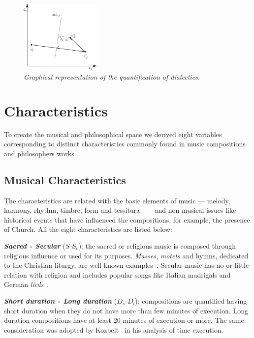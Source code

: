 \documentclass[
 aip,
 jmp,
 amsmath,amssymb,
 reprint,
]{revtex4-1}
\begin{document}
\begin{figure}
        \begin{center}
                \includegraphics[width=0.35\textwidth]{dialetica_.eps}
        \end{center}
        \caption{\it Graphical representation of the quantification of dialectics.}
        \label{fig.2}
\end{figure}

\section{Characteristics}

To create the musical and philosophical space we derived eight variables corresponding to
distinct characteristics commonly found in music compositions and philosophers works. 

\subsection{Musical Characteristics}

The
characteristics are related with the basic elements of music --- melody,
harmony, rhythm, timbre, form and tessitura~\cite{BennettHistory} --- and
non-musical issues like historical events that have influenced the
compositions, for example, the
presence of Church. All the eight
characteristics are listed below:

{\bf \em{ Sacred - Secular}} ($S$-$S_c$): the sacred or religious music is
composed through religious influence or used for its purposes. \textit{Masses},
\textit{motets} and hymns, dedicated to the Christian liturgy, are well known examples~\cite{Lovelock}. Secular
music has no or little relation with religion and includes
popular songs like Italian madrigals and German \textit{lieds}~\cite{BennettHistory}. 

{\bf \em{ Short duration - Long duration}} ($D_s$-$D_l$): compositions are
quantified having short duration when they do not have more than few minutes
of execution. Long duration compositions have at least 20 minutes of execution or
more. The same consideration was adopted by Kozbelt~\cite{Kozbelt01012009,
  Kozbelt01012007} in his analysis of time execution.
\end{document}
